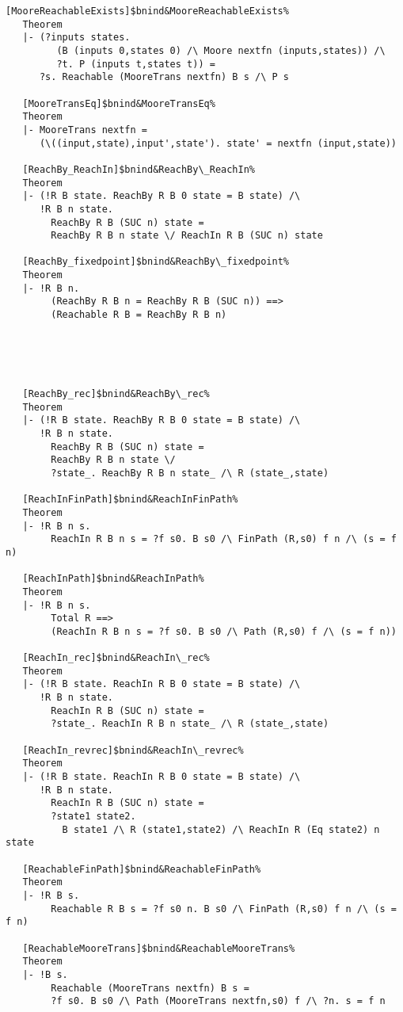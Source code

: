 \documentclass[12pt]{article}
\begin{document}
\begin{footnotesize}
\begin{Verbatim}[commandchars=\$\&\%]
   [MooreReachableExists]$bnind&MooreReachableExists%
   Theorem
   |- (?inputs states.
         (B (inputs 0,states 0) /\ Moore nextfn (inputs,states)) /\
         ?t. P (inputs t,states t)) =
      ?s. Reachable (MooreTrans nextfn) B s /\ P s
   
   [MooreTransEq]$bnind&MooreTransEq%
   Theorem
   |- MooreTrans nextfn =
      (\((input,state),input',state'). state' = nextfn (input,state))
   
   [ReachBy_ReachIn]$bnind&ReachBy\_ReachIn%
   Theorem
   |- (!R B state. ReachBy R B 0 state = B state) /\
      !R B n state.
        ReachBy R B (SUC n) state =
        ReachBy R B n state \/ ReachIn R B (SUC n) state
   
   [ReachBy_fixedpoint]$bnind&ReachBy\_fixedpoint%
   Theorem
   |- !R B n.
        (ReachBy R B n = ReachBy R B (SUC n)) ==>
        (Reachable R B = ReachBy R B n)
   




   [ReachBy_rec]$bnind&ReachBy\_rec%
   Theorem
   |- (!R B state. ReachBy R B 0 state = B state) /\
      !R B n state.
        ReachBy R B (SUC n) state =
        ReachBy R B n state \/
        ?state_. ReachBy R B n state_ /\ R (state_,state)
   
   [ReachInFinPath]$bnind&ReachInFinPath%
   Theorem
   |- !R B n s.
        ReachIn R B n s = ?f s0. B s0 /\ FinPath (R,s0) f n /\ (s = f n)
   
   [ReachInPath]$bnind&ReachInPath%
   Theorem
   |- !R B n s.
        Total R ==>
        (ReachIn R B n s = ?f s0. B s0 /\ Path (R,s0) f /\ (s = f n))
   
   [ReachIn_rec]$bnind&ReachIn\_rec%
   Theorem
   |- (!R B state. ReachIn R B 0 state = B state) /\
      !R B n state.
        ReachIn R B (SUC n) state =
        ?state_. ReachIn R B n state_ /\ R (state_,state)
   
   [ReachIn_revrec]$bnind&ReachIn\_revrec%
   Theorem
   |- (!R B state. ReachIn R B 0 state = B state) /\
      !R B n state.
        ReachIn R B (SUC n) state =
        ?state1 state2.
          B state1 /\ R (state1,state2) /\ ReachIn R (Eq state2) n state
   
   [ReachableFinPath]$bnind&ReachableFinPath%
   Theorem
   |- !R B s.
        Reachable R B s = ?f s0 n. B s0 /\ FinPath (R,s0) f n /\ (s = f n)
   
   [ReachableMooreTrans]$bnind&ReachableMooreTrans%
   Theorem
   |- !B s.
        Reachable (MooreTrans nextfn) B s =
        ?f s0. B s0 /\ Path (MooreTrans nextfn,s0) f /\ ?n. s = f n
   

\end{Verbatim}
\end{footnotesize}
\end{document}
